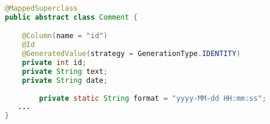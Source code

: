\begin{lstlisting}[language=Java,  basicstyle=\footnotesize]
@MappedSuperclass
public abstract class Comment {

	@Column(name = "id")
	@Id
	@GeneratedValue(strategy = GenerationType.IDENTITY)
	private int id;
	private String text;
	private String date;
        
        private static String format = "yyyy-MM-dd HH:mm:ss";
   ...
}
\end{lstlisting}